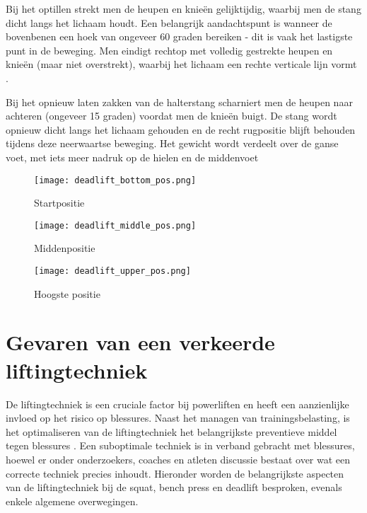 \medskip

Bij het optillen strekt men de heupen en knieën gelijktijdig, waarbij men de stang dicht langs het lichaam houdt. 
Een belangrijk aandachtspunt is wanneer de bovenbenen een hoek van ongeveer 60 graden bereiken - dit is vaak het lastigste punt in de beweging. 
Men eindigt rechtop met volledig gestrekte heupen en knieën (maar niet overstrekt), waarbij het lichaam een rechte verticale lijn vormt \autocite{Ronai2020}.

\medskip

Bij het opnieuw laten zakken van de halterstang scharniert men de heupen naar achteren (ongeveer 15 graden) voordat men de knieën buigt.
De stang wordt opnieuw dicht langs het lichaam gehouden en de recht rugpositie blijft behouden tijdens deze neerwaartse beweging.
Het gewicht wordt verdeelt over de ganse voet, met iets meer nadruk op de hielen en de middenvoet \autocite{Ronai2020}

\begin{figure}[h]
  \centering
  \begin{minipage}[t]{0.32\textwidth}
    \centering
    \texttt{[image: deadlift\_bottom\_pos.png]}
    \caption[Startpositie deadlift]{\label{fig:deadlift_startpositie} Startpositie \autocite{Ronai2020}}
  \end{minipage}
  \hfill
  \begin{minipage}[t]{0.32\textwidth}
    \centering
    \texttt{[image: deadlift\_middle\_pos.png]}
    \caption[Middenste positie deadlift]{\label{fig:deadlift_middenpositie} Middenpositie \autocite{Ronai2020}}
  \end{minipage}
  \hfill
  \begin{minipage}[t]{0.32\textwidth}
    \centering
    \texttt{[image: deadlift\_upper\_pos.png]}
    \caption[Hoogste positie deadlift]{\label{fig:deadlift_bovenpositie} Hoogste positie \autocite{Ronai2020}}
  \end{minipage}
\end{figure}

\section{Gevaren van een verkeerde liftingtechniek}
\label{sec:gevaren-verkeerde-liftingtechniek}
De liftingtechniek is een cruciale factor bij powerliften en heeft een aanzienlijke invloed op het risico op blessures. 
Naast het managen van trainingsbelasting, is het optimaliseren van de liftingtechniek het belangrijkste preventieve middel tegen blessures \autocite{StrömbäckEtAl2018}. 
Een suboptimale techniek is in verband gebracht met blessures, hoewel er onder onderzoekers, coaches en atleten discussie bestaat over wat een correcte techniek precies inhoudt. 
Hieronder worden de belangrijkste aspecten van de liftingtechniek bij de squat, bench press en deadlift besproken, evenals enkele algemene overwegingen.


